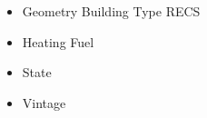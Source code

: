 \begin{itemize}
\item Geometry Building Type RECS
\item Heating Fuel
\item State
\item Vintage
\end{itemize}
